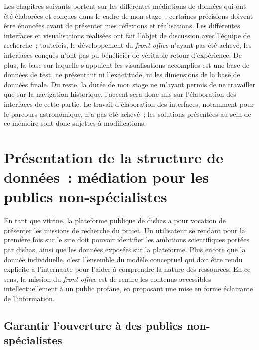 \documentclass[a4paper,12pt,twoside]{book}
\newcommand{\clearemptydoublepage}{\newpage{\pagestyle{empty}\cleardoublepage}}
\newcommand{\eng}{\emph}
\newcommand{\bdd}{base de données\xspace}
\newcommand{\fo}{\eng{front office}\xspace}
\newcommand{\dishas}{\gls{dishas}\xspace}
\begin{document}
Les chapitres suivants portent sur les différentes médiations de données qui ont été élaborées et conçues dans le cadre de mon stage~: certaines précisions doivent être énoncées avant de présenter mes réflexions et réalisations. Les différentes interfaces et visualisations réalisées ont fait l'objet de discussion avec l'équipe de recherche~; toutefois, le développement du \fo n'ayant pas été achevé, les interfaces conçues n'ont pas pu bénéficier de véritable retour d'expérience. De plus, la base sur laquelle s'appuient les visualisations accomplies est une \bdd de test, ne présentant ni l'exactitude, ni les dimensions de la base de données finale. Du reste, la durée de mon stage ne m'ayant permis de ne travailler que sur la navigation historique, l'accent sera donc mis sur l'élaboration des interfaces de cette partie. Le travail d'élaboration des interfaces, notamment pour le parcours astronomique, n'a pas été achevé~; les solutions présentées au sein de ce mémoire sont donc sujettes à modifications.

\clearemptydoublepage

\chapter[Médiation pour les publics non-spécialistes]{Présentation de la structure de données~: médiation pour les publics non-spécialistes}
En tant que vitrine, la plateforme publique de \dishas a pour vocation de présenter les missions de recherche du projet. Un utilisateur se rendant pour la première fois sur le site doit pouvoir identifier les ambitions scientifiques portées par \dishas, ainsi que les données exposées sur la plateforme. Plus encore que la donnée individuelle, c'est l'ensemble du modèle conceptuel qui doit être rendu explicite à l'internaute pour l'aider à comprendre la nature des ressources. En ce sens, la mission du \fo est de rendre les contenus accessibles intellectuellement à un public profane, en proposant une mise en forme éclairante de l'information.

	\section{Garantir l'ouverture à des publics non-spécialistes}
\end{document}
